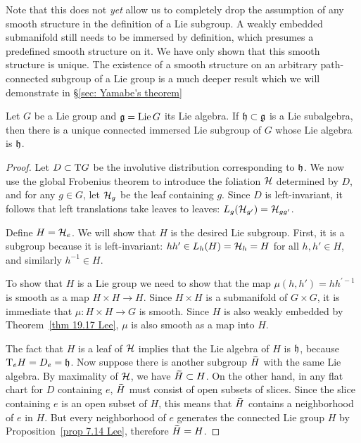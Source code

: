 \begin{rem}
    Note that this does not \emph{yet} allow us to completely drop the assumption of any smooth structure in the definition of a Lie subgroup. A weakly embedded submanifold still needs to be immersed by definition, which presumes a predefined smooth structure on it. We have only shown that this smooth structure is unique. The existence of a smooth structure on an arbitrary path-connected subgroup of a Lie group is a much deeper result which we will demonstrate in \S\ref{sec: Yamabe's theorem}
\end{rem}

\begin{thm} Let $G$ be a Lie group and $\mathfrak{g}=\operatorname{Lie} G$ its Lie algebra. If $\mathfrak{h}\subset \mathfrak{g}$ is a Lie subalgebra, then there is a unique connected immersed Lie subgroup of $G$ whose Lie algebra is $\mathfrak{h}$.
\end{thm}
\begin{proof}
    Let $D\subset \mathrm{T} G$ be the involutive distribution corresponding to $\mathfrak{h}$. We now use the global Frobenius theorem to introduce the foliation $\mathcal{H}$ determined by $D$, and for any $g\in G$, let $\mathcal{H}_g$ be the leaf containing $g$. Since $D$ is left-invariant, it follows that left translations take leaves to leaves: $L_g(\mathcal{H}_{g'})=\mathcal{H}_{gg'}$.

    Define $H=\mathcal{H}_e$. We will show that $H$ is the desired Lie subgroup. First, it is a subgroup because it is left-invariant: $hh'\in L_h(H)=\mathcal{H}_h=H$ for all $h,h'\in H$, and similarly $h^{-1}\in H$.

    To show that $H$ is a Lie group we need to show that the map $\mu(h,h')=hh^{\prime -1}$ is smooth as a map $H\times H\to H$. Since $H\times H$ is a submanifold of $G\times G$, it is immediate that $\mu:H\times H\to G$ is smooth. Since $H$ is also weakly embedded by Theorem~\ref{thm 19.17 Lee}, $\mu$ is also smooth as a map into $H$.

    The fact that $H$ is a leaf of $\mathcal{H}$ implies that the Lie algebra of $H$ is $\mathfrak{h}$, because $\mathrm{T}_eH=D_e=\mathfrak{h}$. Now suppose there is another subgroup $\wt{H}$ with the same Lie algebra. By maximality of $\mathcal{H}$, we have $\wt H\subset H$. On the other hand, in any flat chart for $D$ containing $e$, $\wt H$ must consist of open subsets of slices. Since the slice containing $e$ is an open subset of $H$, this means that $\wt H$ contains a neighborhood of $e$ in $H$. But every neighborhood of $e$ generates the connected Lie group $H$ by Proposition~\ref{prop 7.14 Lee}, therefore $\wt H=H$.
\end{proof}


